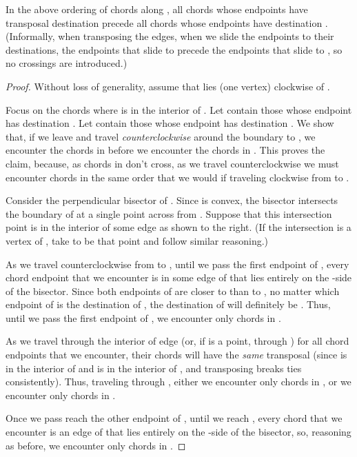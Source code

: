 \documentclass[final]{siamltex}
\begin{document}
\begin{lemma}\label{lemma:ordering}
  In the above ordering of chords along ,
  all chords whose endpoints have transposal destination  
  precede all chords whose endpoints have destination .
  (Informally, when transposing the edges, when we slide the endpoints
  to their destinations, the endpoints that slide to  precede
  the endpoints that slide to , so no crossings are introduced.)
\end{lemma}

\begin{proof}
Without loss of generality, assume that  lies (one vertex) clockwise of .
\begin{window}
\noindent Focus on the chords  where  is in the interior of .
Let  contain those whose endpoint  has destination .
Let  contain those whose endpoint  has destination .
We show that, if we leave  and travel {\em counterclockwise} around the boundary to ,
we encounter the chords in  before we encounter the chords in .
This proves the claim, because, as chords in  don't cross, 
as we travel counterclockwise
we must encounter chords in the same order
that we would if traveling clockwise from  to .
\end{window}

\begin{window}
Consider the perpendicular bisector of .
Since  is convex, the bisector intersects the boundary of 
at a single point across from .
Suppose that this intersection point is in the interior of some edge 
as shown to the right.  
(If the intersection is a vertex of , take  to be that point
and follow similar reasoning.)

\hspace*{\parindent}As we travel counterclockwise from  to ,
until we pass the first endpoint of , every chord endpoint  that we encounter 
is in some edge  of  that lies entirely on the -side of the bisector.
Since both endpoints of  are closer to  than to ,
no matter which endpoint of  is the destination of ,
the destination of  will definitely be .
Thus, until we pass the first endpoint of , we encounter only chords in .
\end{window}

As we travel through the interior of edge  (or, if  is a point, through )
for all chord endpoints  that we encounter,
their chords  will have the {\em same} transposal
(since  is in the interior of  
and  is in the interior of , and transposing breaks ties consistently).
Thus, traveling through , either we encounter only chords in ,
or we encounter only chords in .

Once we pass reach the other endpoint of , until we reach ,
every chord that we encounter
is an edge of  that lies entirely on the -side of the bisector,
so, reasoning as before, we encounter only chords in .
\end{proof}
\end{document}
